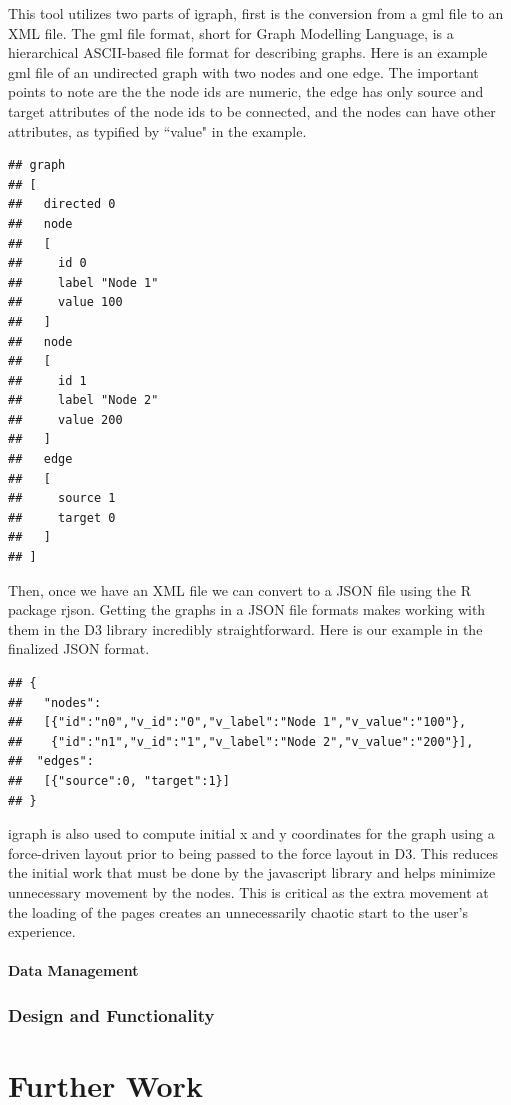 \documentclass{article}\usepackage{graphicx, color}
\makeatletter
\newenvironment{kframe}{%
 \def\at@end@of@kframe{}%
 \ifinner\ifhmode%
  \def\at@end@of@kframe{\end{minipage}}%
  \begin{minipage}{\columnwidth}%
 \fi\fi%
 \def\FrameCommand##1{\hskip\@totalleftmargin \hskip-\fboxsep
 \colorbox{shadecolor}{##1}\hskip-\fboxsep
     \hskip-\linewidth \hskip-\@totalleftmargin \hskip\columnwidth}%
 \MakeFramed {\advance\hsize-\width
   \@totalleftmargin\z@ \linewidth\hsize
   \@setminipage}}%
 {\par\unskip\endMakeFramed%
 \at@end@of@kframe}
\newenvironment{knitrout}{}{} %
\makeatother
\begin{document}
This tool utilizes two parts of igraph, first is the conversion from a gml file to an XML file. The gml file format, short for Graph Modelling Language, is a hierarchical ASCII-based file format for describing graphs. Here is an example gml file of an undirected graph with two nodes and one edge. The important points to note are the the node ids are numeric, the edge has only source and target attributes of the node ids to be connected, and the nodes can have other attributes, as typified by ``value" in the example.
\begin{knitrout}
\color{fgcolor}\begin{kframe}
\begin{verbatim}
## graph
## [
##   directed 0
##   node
##   [
##     id 0
##     label "Node 1"
##     value 100
##   ]
##   node
##   [
##     id 1
##     label "Node 2"
##     value 200
##   ]
##   edge
##   [
##     source 1
##     target 0
##   ]
## ]
\end{verbatim}
\end{kframe}
\end{knitrout}


Then, once we have an XML file we can convert to a JSON file using the R package rjson.\cite{acb-rjson} Getting the graphs in a JSON file formats makes working with them in the D3 library incredibly straightforward. Here is our example in the finalized JSON format.
\begin{knitrout}
\color{fgcolor}\begin{kframe}
\begin{verbatim}
## {
##   "nodes":
##   [{"id":"n0","v_id":"0","v_label":"Node 1","v_value":"100"}, 
##    {"id":"n1","v_id":"1","v_label":"Node 2","v_value":"200"}], 
##  "edges":
##   [{"source":0, "target":1}]
## }
\end{verbatim}
\end{kframe}
\end{knitrout}



igraph is also used to compute initial x and y coordinates for the graph using a force-driven layout prior to being passed to the force layout in D3. This reduces the initial work that must be done by the javascript library and helps minimize unnecessary movement by the nodes. This is critical as the extra movement at the loading of the pages creates an unnecessarily chaotic start to the user's experience.



\subsection{Data Management}
\section{Design and Functionality}

\part{Further Work}

\printbibliography
\end{document}
